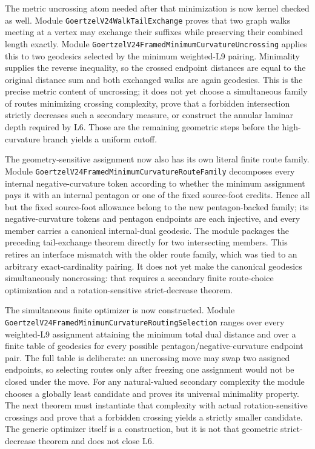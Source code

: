 \documentclass[11pt]{article}
\theoremstyle{definition}
\begin{document}
The metric uncrossing atom needed after that minimization is now kernel checked
as well.  Module \texttt{GoertzelV24WalkTailExchange} proves that two graph
walks meeting at a vertex may exchange their suffixes while preserving their
combined length exactly.  Module
\texttt{GoertzelV24FramedMinimumCurvatureUncrossing} applies this to two
geodesics selected by the minimum weighted-L9 pairing.  Minimality supplies the
reverse inequality, so the crossed endpoint distances are equal to the
original distance sum and both exchanged walks are again geodesics.  This is
the precise metric content of uncrossing; it does not yet choose a simultaneous
family of routes minimizing crossing complexity, prove that a forbidden
intersection strictly decreases such a secondary measure, or construct the
annular laminar depth required by L6.  Those are the remaining geometric steps
before the high-curvature branch yields a uniform cutoff.

The geometry-sensitive assignment now also has its own literal finite route
family.  Module
\texttt{GoertzelV24FramedMinimumCurvatureRouteFamily} decomposes every internal
negative-curvature token according to whether the minimum assignment pays it
with an internal pentagon or one of the fixed source-foot credits.  Hence all
but the fixed source-foot allowance belong to the new pentagon-backed family;
its negative-curvature tokens and pentagon endpoints are each injective, and
every member carries a canonical internal-dual geodesic.  The module packages
the preceding tail-exchange theorem directly for two intersecting members.
This retires an interface mismatch with the older route family, which was tied
to an arbitrary exact-cardinality pairing.  It does not yet make the canonical
geodesics simultaneously noncrossing: that requires a secondary finite
route-choice optimization and a rotation-sensitive strict-decrease theorem.

The simultaneous finite optimizer is now constructed.  Module
\texttt{GoertzelV24FramedMinimumCurvatureRoutingSelection} ranges over every
weighted-L9 assignment attaining the minimum total dual distance and over a
finite table of geodesics for every possible pentagon/negative-curvature
endpoint pair.  The full table is deliberate: an uncrossing move may swap two
assigned endpoints, so selecting routes only after freezing one assignment
would not be closed under the move.  For any natural-valued secondary
complexity the module chooses a globally least candidate and proves its
universal minimality property.  The next theorem must instantiate that
complexity with actual rotation-sensitive crossings and prove that a forbidden
crossing yields a strictly smaller candidate.  The generic optimizer itself is
a construction, but it is not that geometric strict-decrease theorem and does
not close L6.
\end{document}
